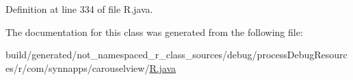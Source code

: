 Definition at line 334 of file R.\+java.



The documentation for this class was generated from the following file\+:\begin{DoxyCompactItemize}
\item 
build/generated/not\+\_\+namespaced\+\_\+r\+\_\+class\+\_\+sources/debug/process\+Debug\+Resources/r/com/synnapps/carouselview/\mbox{\hyperlink{com_2synnapps_2carouselview_2_r_8java}{R.\+java}}\end{DoxyCompactItemize}
